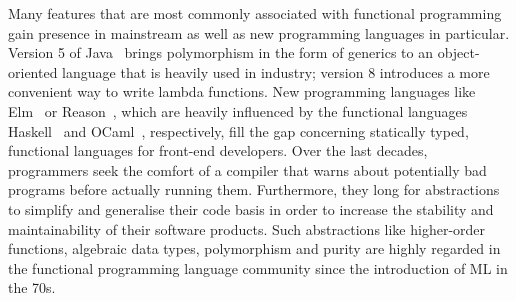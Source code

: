 %


Many features that are most commonly associated with functional programming gain presence in mainstream as well as new programming languages in particular.
Version 5 of Java~\citep{arnold2005java} brings polymorphism in the form of generics to an object\--oriented language that is heavily used in industry; version 8 introduces a more convenient way to write lambda functions.
New programming languages like Elm~\citep{czaplicki2012elm} or Reason~\citep{2019reasonml}, which are heavily influenced by the functional languages Haskell~\citep{jones2002haskell} and OCaml~\citep{minsky2013real}, respectively, fill the gap concerning statically typed, functional languages for front\--end developers.
Over the last decades, programmers seek the comfort of a compiler that warns about potentially bad programs before actually running them.
Furthermore, they long for abstractions to simplify and generalise their code basis in order to increase the stability and maintainability of their software products.
Such abstractions like higher\--order functions, algebraic data types, polymorphism and purity are highly regarded in the functional programming language community since the introduction of ML in the 70s.

